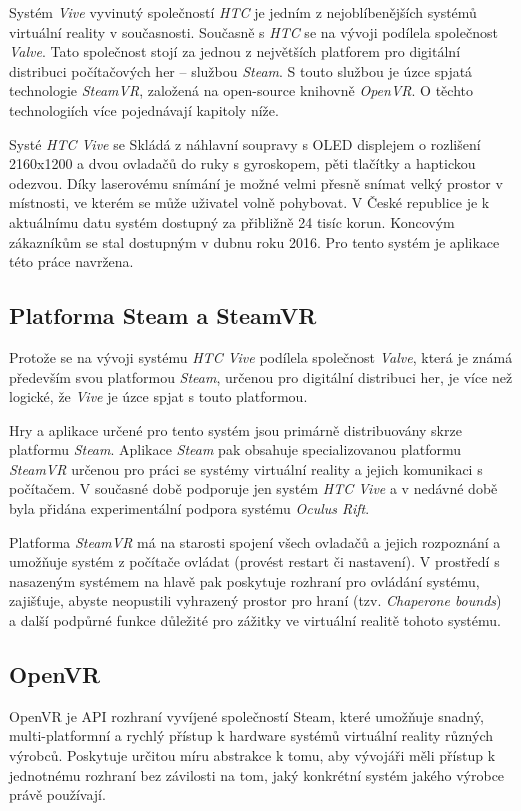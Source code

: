 Systém \emph{Vive} vyvinutý společností \emph{HTC} je jedním z
nejoblíbenějších systémů virtuální reality v současnosti. Současně s
\emph{HTC} se na vývoji podílela společnost \emph{Valve}. Tato
společnost stojí za jednou z největších platforem pro digitální
distribuci počítačových her -- službou \emph{Steam}. S touto službou je
úzce spjatá technologie \emph{SteamVR}, založená na open-source knihovně
\emph{OpenVR}. O těchto technologiích více pojednávají kapitoly níže.

Systé \emph{HTC Vive} se Skládá z náhlavní soupravy s OLED displejem o
rozlišení 2160x1200 a dvou ovladačů do ruky s gyroskopem, pěti tlačítky
a haptickou odezvou. Díky laserovému snímání je možné velmi přesně
snímat velký prostor v místnosti, ve kterém se může uživatel volně
pohybovat. V České republice je k aktuálnímu datu systém dostupný za
přibližně 24 tisíc korun. Koncovým zákazníkům se stal dostupným v dubnu
roku 2016. Pro tento systém je aplikace této práce navržena.


\subsection{Platforma Steam a SteamVR}\label{platforma-steam-a-steamvr}

Protože se na vývoji systému \emph{HTC Vive} podílela společnost
\emph{Valve}, která je známá především svou platformou \emph{Steam},
určenou pro digitální distribuci her, je více než logické, že
\emph{Vive} je úzce spjat s touto platformou.

Hry a aplikace určené pro tento systém jsou primárně distribuovány skrze
platformu \emph{Steam}. Aplikace \emph{Steam} pak obsahuje
specializovanou platformu \emph{SteamVR} určenou pro práci se systémy
virtuální reality a jejich komunikaci s počítačem. V současné době
podporuje jen systém \emph{HTC Vive} a v nedávné době byla přidána
experimentální podpora systému \emph{Oculus Rift}.

Platforma \emph{SteamVR} má na starosti spojení všech ovladačů a jejich
rozpoznání a umožňuje systém z počítače ovládat (provést restart či
nastavení). V prostředí s nasazeným systémem na hlavě pak poskytuje
rozhraní pro ovládání systému, zajišťuje, abyste neopustili vyhrazený
prostor pro hraní (tzv. \emph{Chaperone bounds}) a další podpůrné funkce
důležité pro zážitky ve virtuální realitě tohoto systému.

\subsection{OpenVR}\label{openvr}

OpenVR je API rozhraní vyvíjené společností Steam, které umožňuje
snadný, multi-platformní a rychlý přístup k hardware systémů virtuální
reality různých výrobců. Poskytuje určitou míru abstrakce k tomu, aby
vývojáři měli přístup k jednotnému rozhraní bez závilosti na tom, jaký
konkrétní systém jakého výrobce právě používají.

